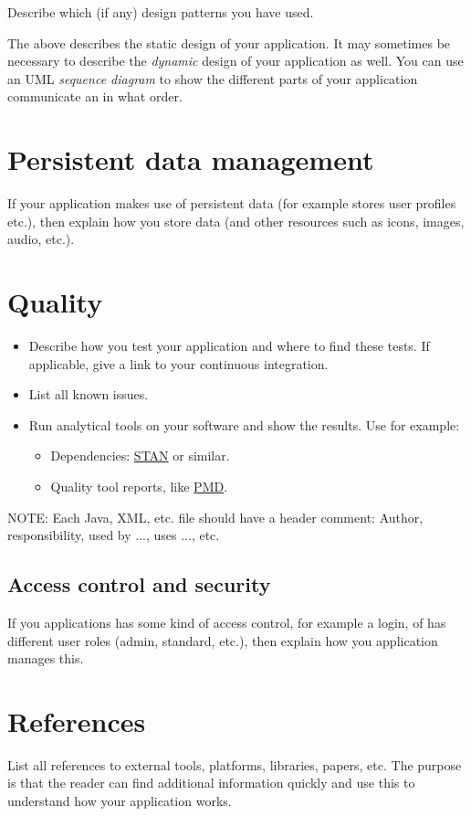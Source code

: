 \documentclass[12pt,a4paper]{scrartcl}
\begin{document}
Describe which (if any) design patterns you have used.

The above describes the static design of your application. It may sometimes be
necessary to describe the \emph{dynamic} design of your application as well. You 
can use an UML \emph{sequence diagram} to show the different parts of your
application communicate an in what order.


\section{Persistent data management}

If your application makes use of persistent data (for example stores user
profiles etc.), then explain how you store data (and other resources such as 
icons, images, audio, etc.). 


\section{Quality}

\begin{itemize}
  \item Describe how you test your application and where to find these tests. If 
    applicable, give a link to your continuous integration.
  \item List all known issues.
  \item Run analytical tools on your software and show the results. Use for example:
    \begin{itemize}
      \item Dependencies: \href{http://stan4j.com/}{STAN} or similar.
      \item Quality tool reports, like \href{http://filehippo.com/download_pmd/}{PMD}.
    \end{itemize}
\end{itemize}

NOTE: Each Java, XML, etc. file should have a header comment: Author,
responsibility, used by ..., uses ..., etc.


\subsection{Access control and security}

If you applications has some kind of access control, for example a login, of
has different user roles (admin, standard, etc.), then explain how you 
application manages this. 


\section{References}

List all references to external tools, platforms, libraries, papers, etc. The
purpose is that the reader can find additional information quickly and use this
to understand how your application works.
\end{document}
